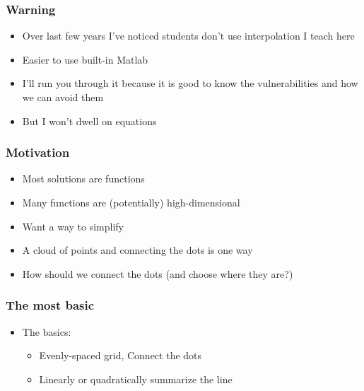 \documentclass{beamer}
\author{Trevor Gallen}
\date{}
\begin{document}
\begin{frame}
\titlepage
\end{frame}

\begin{frame}
\frametitle[alignment=center]{Warning}
\begin{itemize}
\item Over last few years I've noticed students don't use interpolation I teach here
\bigskip
\item Easier to use built-in Matlab
\bigskip
\item I'll run you through it because it is good to know the vulnerabilities and how we can avoid them
\bigskip
\item But I won't dwell on equations
\end{itemize}
\end{frame}

\begin{frame}
\frametitle[alignment=center]{Motivation}
\begin{itemize}
\item Most solutions are functions
\bigskip
\item Many functions are (potentially) high-dimensional
\bigskip
\item Want a way to simplify
\bigskip
\item A cloud of points and connecting the dots is one way
\bigskip
\item How should we connect the dots (and choose where they are?)
\end{itemize}
\end{frame}

\begin{frame}
\frametitle[alignment=center]{The most basic}
\begin{itemize}
\item The basics:
\bigskip
\begin{itemize}
\item Evenly-spaced grid, Connect the dots
\bigskip
\item Linearly or quadratically summarize the line
\end{itemize}
\end{itemize}
\end{frame}
\end{document}

